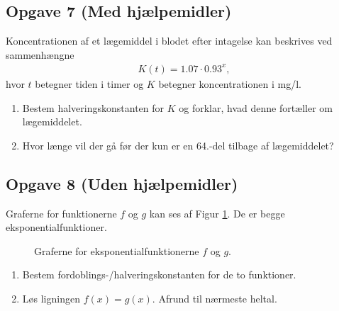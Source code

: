 \documentclass[12pt]{article}
\begin{document}
\subsection*{Opgave 7 (Med hjælpemidler)}
Koncentrationen af et lægemiddel i blodet efter intagelse kan beskrives ved sammenhængne
\begin{align*}
	K(t) = 1.07\cdot 0.93^x,
\end{align*}
hvor $t$ betegner tiden i timer og $K$ betegner koncentrationen i mg/l.
\begin{enumerate}[label=\roman*)]
	\item Bestem halveringskonstanten for $K$ og forklar, hvad denne fortæller om lægemiddelet.
	\item Hvor længe vil der gå før der kun er en 64.-del tilbage af lægemiddelet?
\end{enumerate}
\newpage
\subsection*{Opgave 8 (Uden hjælpemidler)}
Graferne for funktionerne $f$ og $g$ kan ses af Figur \ref{fig:forhalv}. De er begge eksponentialfunktioner. 
\begin{figure}[H]
	\centering
	\caption{Graferne for eksponentialfunktionerne $f$ og $g$.}
	\label{fig:forhalv}
\end{figure}
\begin{enumerate}[label=\roman*)]
	\item Bestem fordoblings-/halveringskonstanten for de to funktioner.
	\item Løs ligningen $f(x) = g(x)$. Afrund til nærmeste heltal.
\end{enumerate}
\end{document}
